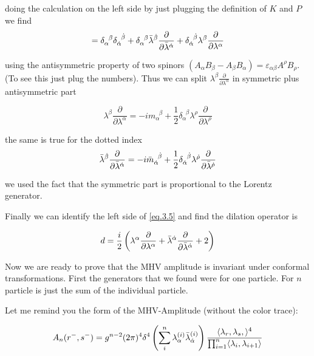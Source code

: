doing the calculation on the left side by just plugging the definition of $K$ and $P$ we find 
\begin{equation}
[K_{\aad},P^{\bdb}] = \delta_{\alpha}^{\;\; \beta} \delta_{\alphad}^{\;\; \betad} + \delta_{\alpha}^{\;\; \beta} \lambdab^{\betad}\frac{\partial}{\partial \lambdab^{\alphad}} + \delta_{\alphad}^{\;\; \betad} \lambda^{\beta}\frac{\partial}{\partial \lambda^{\alpha}}
\end{equation} 


using the antisymmetric property of two spinors $(A_{\alpha}B_{\beta} -A_{\beta}B_{\alpha}) = \varepsilon_{\alpha\beta}A^{\rho}B_{\rho}$. (To see this just plug the numbers). Thus we can split $ \lambda^{\beta}\frac{\partial}{\partial \lambda^{\alpha}}$ in symmetric plus antisymmetric part

\begin{equation}
\lambda^{\beta}\frac{\partial}{\partial \lambda^{\alpha}} = -i m_{\alpha}^{\;\; \beta} + \frac{1}{2} \delta_{\alpha}^{\;\; \beta} \lambda^{\rho}\frac{\partial}{\partial \lambda^{\rho}}
\label{eq.3.7}
\end{equation}

the same is true for the dotted index
\begin{equation}
\bar{\lambda}^{\dot{\beta}}\frac{\partial}{\partial \bar{\lambda}^{\dot{\alpha}}} = -i \bar{m}_{\dot{\alpha}}^{\;\; \dot{\beta}} + \frac{1}{2} \delta_{\dot{\alpha}}^{\;\; \dot{\beta}} \lambda^{\dot{\rho}}\frac{\partial}{\partial \bar{\lambda}^{\dot{\rho}}}
\end{equation}

we used the fact that the symmetric part is proportional to the Lorentz generator.

Finally we can identify the left side of \eqref{eq.3.5} and find the dilation operator is 


\begin{equation}
d = \frac{i}{2}\left( \lambda^{\alpha} \frac{\partial}{\partial \lambda^{\alpha}}  + \bar{\lambda}^{\dot{\alpha}} \frac{\partial}{\partial \bar{\lambda}^{\dot{\alpha}}} + 2\right) 
\end{equation}

Now we are ready to prove that the MHV amplitude is invariant under conformal transformations. First the generators that we found were for one particle. For $n$ particle is just the sum of the individual particle.

Let me remind you the form of the MHV-Amplitude (without the color trace):

 \begin{equation}
A_{n}(r^{-},s^{-})  =   g^{n-2}(2\pi)^{4}\delta^{4}\left( \sum_{i}^{n}\lambda^{(i)}_{\alpha}\bar{\lambda}^{(i)}_{\dot{\alpha}}  \right) \frac{\langle \lambda_{r},\lambda_{s},\rangle ^{4}}{\prod_{i=1}^{n}\langle \lambda_{i},\lambda_{i+1}\rangle} 
 \end{equation}

